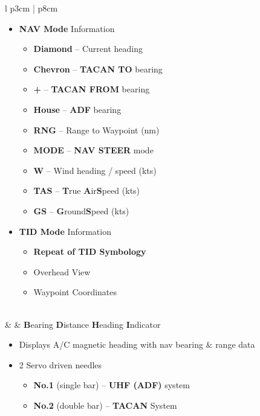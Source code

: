 \documentclass[fontHelvetica]{TechCheck}
\begin{document}
\begin{center}
\begin{longtable}{l p{3cm} | p{8cm}}
			\begin{minipage}[t]{\linewidth}
				\vspace{-7pt}
				\begin{itemize}
					\item \textbf{NAV Mode} Information
					\begin{itemize}
						\item \textbf{Diamond} -- Current heading
						\item \textbf{Chevron} -- \textbf{TACAN TO} bearing
						\item \textbf{+} -- \textbf{TACAN FROM} bearing
						\item \textbf{House} -- \textbf{ADF} bearing
						\item \textbf{RNG} -- Range to Waypoint (nm)
						\item \textbf{MODE} -- \textbf{NAV STEER} mode
						\item \textbf{W} -- Wind heading / speed (kts)
						\item \textbf{TAS} -- \textbf{T}rue \textbf{A}ir\textbf{S}peed (kts)
						\item \textbf{GS} -- \textbf{G}round\textbf{S}peed (kts)
					\end{itemize}
					\item \textbf{TID Mode} Information
					\begin{itemize}
						\item \textbf{Repeat of TID Symbology}
						\item Overhead View
						\item Waypoint Coordinates
					\end{itemize}
				\end{itemize}
			\end{minipage} \\
			\midrule
			\textbf{\textbullet} &  & \textbf{B}earing \textbf{D}istance \textbf{H}eading \textbf{I}ndicator
			\begin{minipage}[t]{\linewidth}
				\vspace{-7pt}
				\begin{itemize}
					\item Displays A/C magnetic heading with nav bearing \& range data
					\item 2 Servo driven needles
					\begin{itemize}
						\item \textbf{No.1} (single bar) -- \textbf{UHF (ADF)} system
						\item \textbf{No.2} (double bar) -- \textbf{TACAN} System
					\end{itemize}
				\end{itemize}
			\end{minipage} \\
			\bottomrule
		\end{longtable}
	\end{center}
\end{document}
